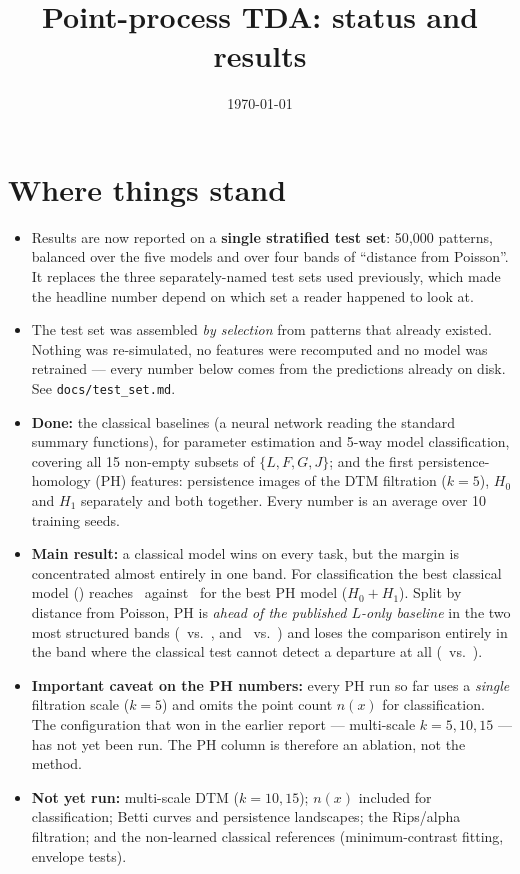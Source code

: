 \documentclass[10pt,a4paper]{article}
\title{\textbf{Point-process TDA: status and results}}
\date{\today}
\begin{document}
\maketitle

\section{Where things stand}

\begin{itemize}
  \item Results are now reported on a \textbf{single stratified test set}: 50{,}000 patterns, balanced over the five models and over four bands of ``distance from Poisson''. It replaces the three separately-named test sets used previously, which made the headline number depend on which set a reader happened to look at.
  \item The test set was assembled \emph{by selection} from patterns that already existed. Nothing was re-simulated, no features were recomputed and no model was retrained --- every number below comes from the predictions already on disk. See \texttt{docs/test\_set.md}.
  \item \textbf{Done:} the classical baselines (a neural network reading the standard summary functions), for parameter estimation and 5-way model classification, covering all 15 non-empty subsets of $\{L,F,G,J\}$; and the first persistence-homology (PH) features: persistence images of the DTM filtration ($k=5$), $H_0$ and $H_1$ separately and both together. Every number is an average over 10 training seeds.
  \item \textbf{Main result:} a classical model wins on every task, but the margin is concentrated almost entirely in one band. For classification the best classical model (\bestclassicalname) reaches \bestclassical\ against \bestph\ for the best PH model ($H_0{+}H_1$). Split by distance from Poisson, PH is \emph{ahead of the published $L$-only baseline} in the two most structured bands (\phmoderate\ vs.\ \lonlyxmoderate, and \phstrong\ vs.\ \lonlyxstrong) and loses the comparison entirely in the band where the classical test cannot detect a departure at all (\phbelow\ vs.\ \lonlyxbelow).
  \item \textbf{Important caveat on the PH numbers:} every PH run so far uses a \emph{single} filtration scale ($k=5$) and omits the point count $n(x)$ for classification. The configuration that won in the earlier report --- multi-scale $k=5,10,15$ --- has not yet been run. The PH column is therefore an ablation, not the method.
  \item \textbf{Not yet run:} multi-scale DTM ($k=10,15$); $n(x)$ included for classification; Betti curves and persistence landscapes; the Rips/alpha filtration; and the non-learned classical references (minimum-contrast fitting, envelope tests).
\end{itemize}
\end{document}
